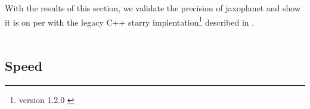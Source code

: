 \documentclass[modern]{aastex631}
\begin{document}

With the results of this section, we validate the precision of \textsf{jaxoplanet} and show it is on per with the legacy C++ \textsf{starry} implentation\footnote{version 1.2.0 \citep{starry_120}} described in \cite{starry}.\\\\

\subsection{Speed}\label{speed}
\end{document}
